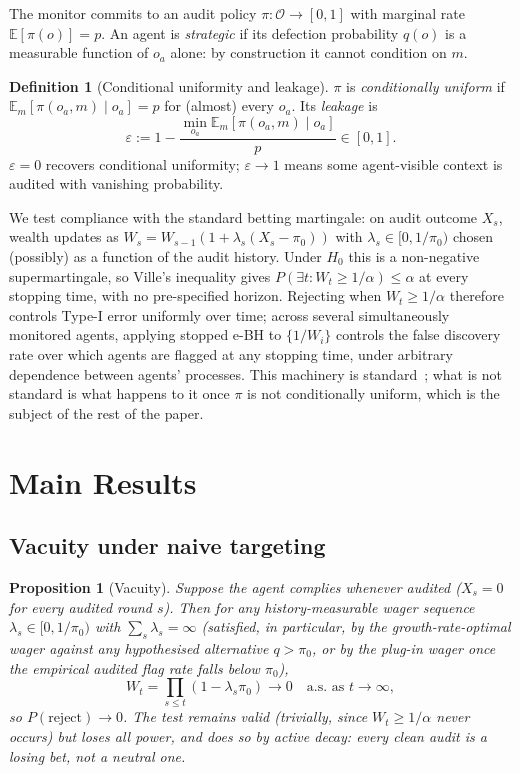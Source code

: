 \documentclass[sigconf,anonymous]{aamas}
\theoremstyle{plain}
\newtheorem{proposition}{Proposition}
\theoremstyle{definition}
\newtheorem{definition}{Definition}
\begin{document}
The monitor commits to an audit policy $\pi : \mathcal{O} \to [0,1]$ with
marginal rate $\mathbb{E}[\pi(o)] = p$. An agent is \emph{strategic} if its
defection probability $q(o)$ is a measurable function of $o_a$ alone: by
construction it cannot condition on $m$.

\begin{definition}[Conditional uniformity and leakage]
\label{def:leakage}
$\pi$ is \emph{conditionally uniform} if $\mathbb{E}_m[\pi(o_a,m) \mid o_a] = p$
for (almost) every $o_a$. Its \emph{leakage} is
\[\varepsilon := 1 - \frac{\min_{o_a} \mathbb{E}_m[\pi(o_a,m)\mid o_a]}{p} \in [0,1].\]
$\varepsilon = 0$ recovers conditional uniformity; $\varepsilon \to 1$ means
some agent-visible context is audited with vanishing probability.
\end{definition}

We test compliance with the standard betting martingale: on audit outcome
$X_s$, wealth updates as $W_s = W_{s-1}(1 + \lambda_s(X_s - \pi_0))$ with
$\lambda_s \in [0, 1/\pi_0)$ chosen (possibly) as a function of the audit
history. Under $H_0$ this is a non-negative supermartingale, so Ville's
inequality gives $P(\exists t : W_t \ge 1/\alpha) \le \alpha$ at every
stopping time, with no pre-specified horizon. Rejecting when $W_t \ge
1/\alpha$ therefore controls Type-I error uniformly over time; across
several simultaneously monitored agents, applying stopped e-BH to
$\{1/W_i\}$ controls the false discovery rate over which agents are flagged
at any stopping time, under arbitrary dependence between agents' processes.
This machinery is standard~\cite{ramdas2022evalues,wang2025stoppedebh}; what
is not standard is what happens to it once $\pi$ is not conditionally
uniform, which is the subject of the rest of the paper.

\section{Main Results}
\label{sec:results}

\subsection{Vacuity under naive targeting}

\begin{proposition}[Vacuity]
\label{prop:vacuity}
Suppose the agent complies whenever audited ($X_s = 0$ for every audited
round $s$). Then for any history-measurable wager sequence $\lambda_s \in
[0,1/\pi_0)$ with $\sum_s \lambda_s = \infty$ (satisfied, in particular, by
the growth-rate-optimal wager against any hypothesised alternative $q >
\pi_0$, or by the plug-in wager once the empirical audited flag rate falls
below $\pi_0$),
\[W_t = \prod_{s\le t}(1-\lambda_s\pi_0) \to 0 \quad \text{a.s.\ as } t\to\infty,\]
so $P(\text{reject}) \to 0$. The test remains valid (trivially, since
$W_t \ge 1/\alpha$ never occurs) but loses all power, and does so by active
decay: every clean audit is a losing bet, not a neutral one.
\end{proposition}
\end{document}
